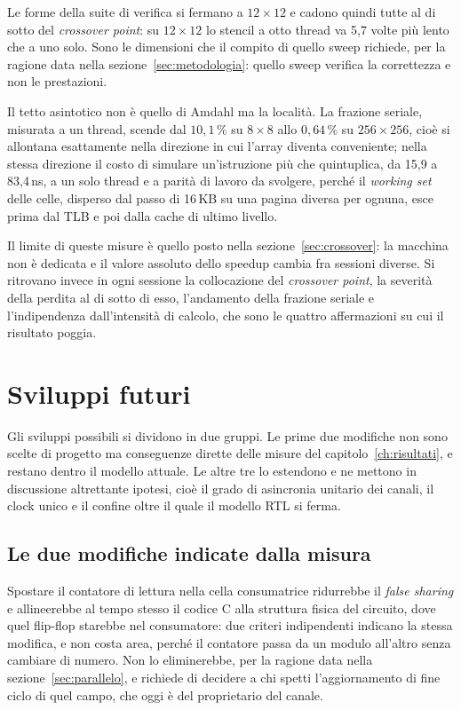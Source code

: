 Le forme della suite di verifica si fermano a $12\times12$ e cadono quindi tutte
al di sotto del \emph{crossover point}: su $12\times12$ lo stencil a otto thread va 5,7 volte
più lento che a uno solo. Sono le dimensioni che il compito di quello sweep richiede,
per la ragione data nella sezione~\ref{sec:metodologia}: quello sweep verifica
la correttezza e non le prestazioni.

Il tetto asintotico non è quello di Amdahl ma la località. La frazione
seriale, misurata a un thread, scende dal $10{,}1\,\%$ su $8\times8$ allo $0{,}64\,\%$ su
$256\times256$, cioè si allontana esattamente nella direzione in cui l'array
diventa conveniente; nella stessa direzione il costo di simulare un'istruzione
più che quintuplica, da 15,9 a 83,4\,ns, a un solo thread e a parità di
lavoro da svolgere, perché il \emph{working set} delle celle, disperso dal passo di
16\,KB su una pagina diversa per ognuna, esce prima dal TLB e poi dalla cache di ultimo livello.

Il limite di queste misure è quello posto nella sezione~\ref{sec:crossover}: la
macchina non è dedicata e il valore assoluto dello speedup cambia fra
sessioni diverse. Si ritrovano invece in ogni sessione la
collocazione del \emph{crossover point}, la severità della perdita al di sotto di esso,
l'andamento della frazione seriale e l'indipendenza dall'intensità di calcolo,
che sono le quattro affermazioni su cui il risultato poggia.

\section{Sviluppi futuri}
\label{sec:sviluppi}

Gli sviluppi possibili si dividono in due gruppi. Le prime due modifiche non
sono scelte di progetto ma conseguenze dirette delle misure del
capitolo~\ref{ch:risultati}, e restano dentro il modello attuale. Le altre tre
lo estendono e ne mettono in discussione altrettante ipotesi, cioè il grado di
asincronia unitario dei canali, il clock unico e il confine oltre il quale il
modello RTL si ferma.

\subsection{Le due modifiche indicate dalla misura}
\label{sec:modifiche-misura}

Spostare il contatore di
lettura nella cella consumatrice ridurrebbe il \emph{false sharing} e
allineerebbe al tempo stesso il codice C alla struttura fisica del circuito,
dove quel flip-flop starebbe nel consumatore: due criteri indipendenti indicano
la stessa modifica, e non costa area, perché il contatore passa da un modulo
all'altro senza cambiare di numero. Non lo eliminerebbe, per la ragione data
nella sezione~\ref{sec:parallelo}, e richiede di decidere a chi spetti
l'aggiornamento di fine ciclo di quel campo, che oggi è del proprietario del
canale.


